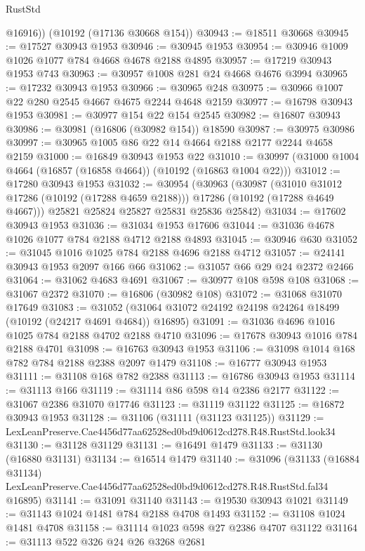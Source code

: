 \begin{lexlean}{RustStd}
\begin{coremodule}
        @16916))
    (@10192 (@17136 @30668 @154))
@30943 := @18511 @30668
@30945 := @17527 @30943 @1953
@30946 := @30945 @1953
@30954 := @30946 @1009 @1026 @1077 @784 @4668 @4678 @2188 @4895
@30957 := @17219 @30943 @1953 @743
@30963 := @30957 @1008 @281 @24 @4668 @4676 @3994
@30965 := @17232 @30943 @1953
@30966 := @30965 @248
@30975 := @30966 @1007 @22 @280 @2545 @4667 @4675 @2244 @4648 @2159
@30977 := @16798 @30943 @1953
@30981 := @30977 @154 @22 @154 @2545
@30982 := @16807 @30943
@30986 := @30981 (@16806 (@30982 @154)) @18590
@30987 := @30975 @30986
@30997 := @30965 @1005 @86 @22 @14 @4664 @2188 @2177 @2244 @4658 @2159
@31000 := @16849 @30943 @1953 @22
@31010 := @30997 (@31000 @1004 @4664 (@16857 (@16858 @4664)) (@10192 (@16863 @1004 @22)))
@31012 := @17280 @30943 @1953
@31032 := @30954
    (@30963
      (@30987
        (@31010 @31012 @17286 (@10192 (@17288 @4659 @2188)))
        @17286
        (@10192 (@17288 @4649 @4667)))
      @25821
      @25824
      @25827
      @25831
      @25836
      @25842)
@31034 := @17602 @30943 @1953
@31036 := @31034 @1953 @17606
@31044 := @31036 @4678 @1026 @1077 @784 @2188 @4712 @2188 @4893
@31045 := @30946 @630
@31052 := @31045 @1016 @1025 @784 @2188 @4696 @2188 @4712
@31057 := @24141 @30943 @1953 @2097 @166 @66
@31062 := @31057 @66 @29 @24 @2372 @2466
@31064 := @31062 @4683 @4691
@31067 := @30977 @108 @598 @108
@31068 := @31067 @2372
@31070 := @16806 (@30982 @108)
@31072 := @31068 @31070 @17649
@31083 := @31052 (@31064 @31072 @24192 @24198 @24264 @18499 (@10192 (@24217 @4691 @4684)) @16895)
@31091 := @31036 @4696 @1016 @1025 @784 @2188 @4702 @2188 @4710
@31096 := @17678 @30943 @1016 @784 @2188 @4701
@31098 := @16763 @30943 @1953
@31106 := @31098 @1014 @168 @782 @784 @2188 @2388 @2097 @1479
@31108 := @16777 @30943 @1953
@31111 := @31108 @168 @782 @2388
@31113 := @16786 @30943 @1953
@31114 := @31113 @166
@31119 := @31114 @86 @598 @14 @2386 @2177
@31122 := @31067 @2386 @31070 @17746
@31123 := @31119 @31122
@31125 := @16872 @30943 @1953
@31128 := @31106 (@31111 (@31123 @31125))
@31129 := LexLeanPreserve.Cae4456d77aa62528ed0bd9d0612cd278.R48.RustStd.look34
@31130 := @31128 @31129
@31131 := @16491 @1479
@31133 := @31130 (@16880 @31131)
@31134 := @16514 @1479
@31140 := @31096
    (@31133
      (@16884 @31134)
      LexLeanPreserve.Cae4456d77aa62528ed0bd9d0612cd278.R48.RustStd.fal34
      @16895)
@31141 := @31091 @31140
@31143 := @19530 @30943 @1021
@31149 := @31143 @1024 @1481 @784 @2188 @4708 @1493
@31152 := @31108 @1024 @1481 @4708
@31158 := @31114 @1023 @598 @27 @2386 @4707 @31122
@31164 := @31113 @522 @326 @24 @26 @3268 @2681

\end{coremodule}
\end{lexlean}
